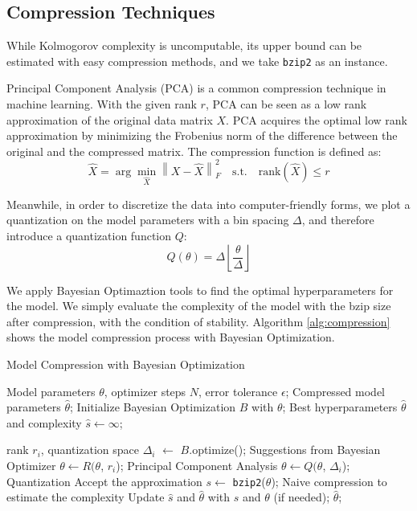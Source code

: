 \documentclass{article}
\begin{document}
\subsection{Compression Techniques}

While Kolmogorov complexity is uncomputable, its upper bound can be estimated with easy compression methods, and we take \texttt{bzip2} as an instance. 

Principal Component Analysis (PCA) is a common compression technique in machine learning. With the given rank $r$, PCA can be seen as a low rank approximation of the original data matrix $X$. PCA acquires the optimal low rank approximation by minimizing the Frobenius norm of the difference between the original and the compressed matrix. The compression function is defined as:
$$
\hat{X} = \arg\min_{\hat{X}} \left\| X - \hat{X} \right\|_F^2 \quad \text{s.t.} \quad \text{rank}(\hat{X}) \le r
$$

Meanwhile, in order to discretize the data into computer-friendly forms, we plot a quantization on the model parameters with a bin spacing $\Delta$, and therefore introduce a quantization function $Q$:
$$
Q(\theta) = \Delta \left\lfloor \frac{\theta}{\Delta} \right\rfloor
$$

We apply Bayesian Optimaztion tools to find the optimal hyperparameters for the model. We simply evaluate the complexity of the model with the bzip size after compression, with the condition of stability. Algorithm \ref{alg:compression} shows the model compression process with Bayesian Optimization.

\begin{algorithm}[!ht]
    \renewcommand{\algorithmicrequire}{\textbf{Input:}}
    \renewcommand{\algorithmicensure}{\textbf{Output:}}
    \caption{Model Compression with Bayesian Optimization}
    \label{alg:compression}
    \begin{algorithmic}[1]
        \Require Model parameters $\theta$, optimizer steps $N$, error tolerance $\epsilon$;
        \Ensure Compressed model parameters $\hat{\theta}$;
        \State Initialize Bayesian Optimization $B$ with $\theta$;
        \State Best hyperparameters $\hat{\theta}$ and complexity $\hat{s} \leftarrow \infty$;
    
        \State rank $r_i$, quantization space $\Delta_i$ $\leftarrow$ $B$.optimize();
        \Comment Suggestions from Bayesian Optimizer
        \State $\theta \leftarrow R(\theta$, $r_i$);
        \Comment Principal Component Analysis
        \State $\theta \leftarrow Q(\theta$, $\Delta_i$);
        \Comment Quantization
        \Comment Accept the approximation
            \State $s \leftarrow$ \texttt{bzip2}($\theta$);
            \Comment Naive compression to estimate the complexity
            \State Update $\hat{s}$ and $\hat{\theta}$ with $s$ and $\theta$ (if needed);
        \EndIf
        \EndFor
        \State \Return $\hat{\theta}$;
 \end{algorithmic}
\end{algorithm}
\end{document}
